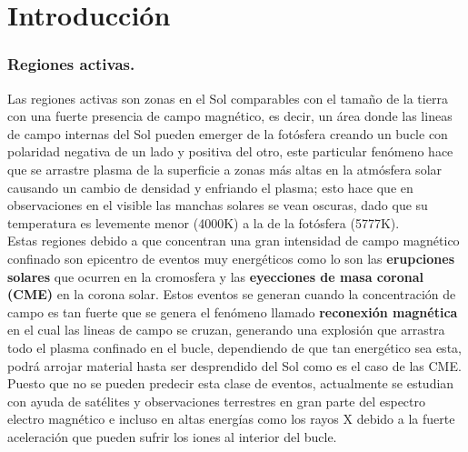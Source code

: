 \chapter{Introducción}

\subsection{Regiones activas.}
Las regiones activas son zonas en el Sol comparables con el tamaño de la tierra con una fuerte presencia de campo magnético, es decir, un área donde las lineas de campo internas del Sol pueden emerger de la fotósfera creando un bucle con polaridad negativa de un lado y positiva del otro, este particular fenómeno hace que se arrastre plasma de la superficie a zonas más altas en la atmósfera solar causando un cambio de densidad y enfriando el plasma; esto hace que en observaciones en el visible las manchas solares se vean oscuras, dado que su temperatura es levemente menor (4000K) a la de la fotósfera  (5777K).\\
Estas regiones debido a que concentran una gran intensidad de campo magnético confinado son epicentro de eventos muy energéticos como lo son las \textbf{erupciones solares} que ocurren en la cromosfera y las \textbf{eyecciones de masa coronal (CME)} en la corona solar. Estos eventos se generan cuando la concentración de campo es tan fuerte que se genera el fenómeno llamado \textbf{reconexión magnética} en el cual las lineas de campo se cruzan, generando una explosión que arrastra todo el plasma confinado en el bucle, dependiendo de que tan energético sea esta, podrá arrojar material hasta ser desprendido del Sol como es el caso de las CME.\\

Puesto que no se pueden predecir esta clase de eventos, actualmente se estudian con ayuda de satélites y observaciones terrestres en gran parte del espectro electro magnético e incluso en altas energías como los rayos X debido a la fuerte aceleración que pueden sufrir los iones al interior del bucle.




